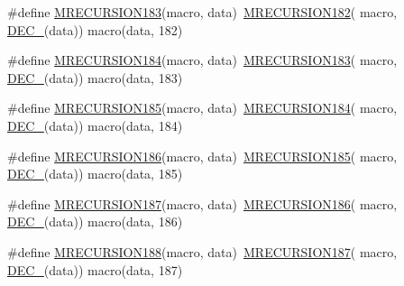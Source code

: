 \begin{DoxyCompactItemize}
\item 
\#define \mbox{\hyperlink{group__group__sam0__utils__mrecursion_gafe3e141260001214362a33542509fd0c}{M\+R\+E\+C\+U\+R\+S\+I\+O\+N183}}(macro,  data)~\mbox{\hyperlink{group__group__sam0__utils__mrecursion_ga4bce301f66e1986fd89df43d3d7a6fd9}{M\+R\+E\+C\+U\+R\+S\+I\+O\+N182}}(  macro, \mbox{\hyperlink{group__group__sam0__utils__mrecursion_ga1d23d683797679dca8c3512a54a5dcae}{D\+E\+C\+\_\+}}(data))   macro(data, 182)
\item 
\#define \mbox{\hyperlink{group__group__sam0__utils__mrecursion_ga0fe22e5153970c4985a82aa915dfc9ce}{M\+R\+E\+C\+U\+R\+S\+I\+O\+N184}}(macro,  data)~\mbox{\hyperlink{group__group__sam0__utils__mrecursion_gafe3e141260001214362a33542509fd0c}{M\+R\+E\+C\+U\+R\+S\+I\+O\+N183}}(  macro, \mbox{\hyperlink{group__group__sam0__utils__mrecursion_ga1d23d683797679dca8c3512a54a5dcae}{D\+E\+C\+\_\+}}(data))   macro(data, 183)
\item 
\#define \mbox{\hyperlink{group__group__sam0__utils__mrecursion_ga302c7936253b9f780ea8a1ab5cd6e53b}{M\+R\+E\+C\+U\+R\+S\+I\+O\+N185}}(macro,  data)~\mbox{\hyperlink{group__group__sam0__utils__mrecursion_ga0fe22e5153970c4985a82aa915dfc9ce}{M\+R\+E\+C\+U\+R\+S\+I\+O\+N184}}(  macro, \mbox{\hyperlink{group__group__sam0__utils__mrecursion_ga1d23d683797679dca8c3512a54a5dcae}{D\+E\+C\+\_\+}}(data))   macro(data, 184)
\item 
\#define \mbox{\hyperlink{group__group__sam0__utils__mrecursion_ga6f3d650ce8b765f93637e4a2e2b06db0}{M\+R\+E\+C\+U\+R\+S\+I\+O\+N186}}(macro,  data)~\mbox{\hyperlink{group__group__sam0__utils__mrecursion_ga302c7936253b9f780ea8a1ab5cd6e53b}{M\+R\+E\+C\+U\+R\+S\+I\+O\+N185}}(  macro, \mbox{\hyperlink{group__group__sam0__utils__mrecursion_ga1d23d683797679dca8c3512a54a5dcae}{D\+E\+C\+\_\+}}(data))   macro(data, 185)
\item 
\#define \mbox{\hyperlink{group__group__sam0__utils__mrecursion_gad8df14bd44a1a58706a68d4ee4c01b6e}{M\+R\+E\+C\+U\+R\+S\+I\+O\+N187}}(macro,  data)~\mbox{\hyperlink{group__group__sam0__utils__mrecursion_ga6f3d650ce8b765f93637e4a2e2b06db0}{M\+R\+E\+C\+U\+R\+S\+I\+O\+N186}}(  macro, \mbox{\hyperlink{group__group__sam0__utils__mrecursion_ga1d23d683797679dca8c3512a54a5dcae}{D\+E\+C\+\_\+}}(data))   macro(data, 186)
\item 
\#define \mbox{\hyperlink{group__group__sam0__utils__mrecursion_ga16bf5f92e153fe0044ed33ca46a5b259}{M\+R\+E\+C\+U\+R\+S\+I\+O\+N188}}(macro,  data)~\mbox{\hyperlink{group__group__sam0__utils__mrecursion_gad8df14bd44a1a58706a68d4ee4c01b6e}{M\+R\+E\+C\+U\+R\+S\+I\+O\+N187}}(  macro, \mbox{\hyperlink{group__group__sam0__utils__mrecursion_ga1d23d683797679dca8c3512a54a5dcae}{D\+E\+C\+\_\+}}(data))   macro(data, 187)

\end{DoxyCompactItemize}
